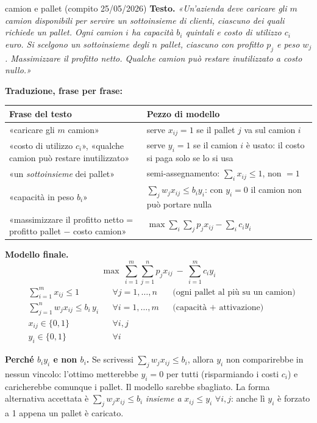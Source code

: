 \documentclass[11pt,a4paper]{article}
\begin{document}
\begin{es}{camion e pallet (compito 25/05/2026)}
\textbf{Testo.} \emph{«Un'azienda deve caricare gli $m$ camion disponibili per servire un
sottoinsieme di clienti, ciascuno dei quali richiede un pallet. Ogni camion $i$ ha capacità
$b_i$ quintali e costo di utilizzo $c_i$ euro. Si scelgono un sottoinsieme degli $n$ pallet,
ciascuno con profitto $p_j$ e peso $w_j$. Massimizzare il profitto netto. Qualche camion può
restare inutilizzato a costo nullo.»}

\medskip
\textbf{Traduzione, frase per frase:}

\begin{center}
\begin{tabular}{@{}p{7.0cm} p{7.4cm}@{}}
\toprule
\textbf{Frase del testo} & \textbf{Pezzo di modello}\\
\midrule
«caricare gli $m$ camion» & serve $x_{ij}=1$ se il pallet $j$ va sul camion $i$\\
\addlinespace
«costo di utilizzo $c_i$», «qualche camion può restare inutilizzato» &
serve $y_i=1$ se il camion $i$ è usato: il costo si paga solo se lo si usa\\
\addlinespace
«un \emph{sottoinsieme} dei pallet» &
semi-assegnamento: $\sum_i x_{ij} \le 1$, non $=1$\\
\addlinespace
«capacità in peso $b_i$» &
$\sum_j w_j x_{ij} \le b_i y_i$: con $y_i=0$ il camion non può portare nulla\\
\addlinespace
«massimizzare il profitto netto = profitto pallet $-$ costo camion» &
$\max \sum_i\sum_j p_j x_{ij} - \sum_i c_i y_i$\\
\bottomrule
\end{tabular}
\end{center}

\medskip
\textbf{Modello finale.}
\[
\max \ \sum_{i=1}^{m}\sum_{j=1}^{n} p_j x_{ij} \ -\ \sum_{i=1}^{m} c_i y_i
\]
\[
\begin{aligned}
&\sum_{i=1}^{m} x_{ij} \le 1 && \forall j = 1,\dots,n &&\text{(ogni pallet al più su un camion)}\\
&\sum_{j=1}^{n} w_j x_{ij} \le b_i\, y_i && \forall i = 1,\dots,m &&\text{(capacità + attivazione)}\\
&x_{ij} \in \{0,1\} && \forall i,j\\
&y_i \in \{0,1\} && \forall i
\end{aligned}
\]

\textbf{Perché $b_i y_i$ e non $b_i$.} Se scrivessi $\sum_j w_j x_{ij} \le b_i$, allora
$y_i$ non comparirebbe in nessun vincolo: l'ottimo metterebbe $y_i = 0$ per tutti (risparmiando
i costi $c_i$) e caricherebbe comunque i pallet. Il modello sarebbe sbagliato.
La forma alternativa accettata è $\sum_j w_j x_{ij}\le b_i$ \emph{insieme a} $x_{ij}\le y_i$
$\forall i,j$: anche lì $y_i$ è forzato a 1 appena un pallet è caricato.
\end{es}
\end{document}

